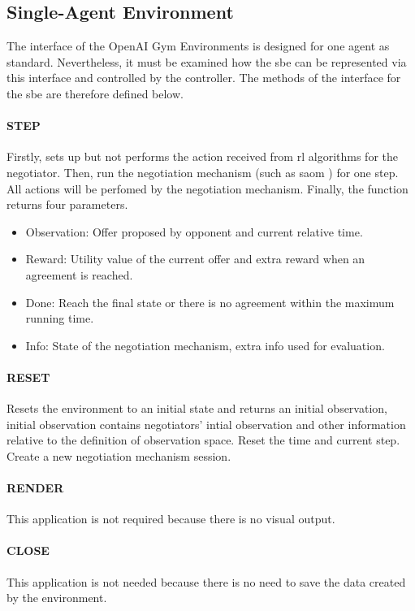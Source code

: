 \subsection{Single-Agent Environment} \label{single-agent-env}
The interface of the OpenAI Gym Environments is designed for one agent as standard. Nevertheless, it must be examined how the \gls{sbe} can be represented via this interface and controlled by the controller. The methods of the interface for the \gls{sbe} are therefore defined below. 

\paragraph{STEP} Firstly, sets up but not performs the action received from \gls{rl} algorithms for the negotiator. Then, run the negotiation mechanism (such as \gls{saom} ) for one step. All actions will be perfomed by the negotiation mechanism. Finally, the function returns four parameters.

\begin{itemize}
	\item Observation: Offer proposed by opponent and current relative time.
	\item Reward: Utility value of the current offer and extra reward when an agreement is reached.
	\item Done: Reach the final state or there is no agreement within the maximum running time.
	\item Info: State of the negotiation mechanism, extra info used for evaluation.
\end{itemize}

\paragraph{RESET} Resets the environment to an initial state and returns an initial observation, initial observation contains negotiators' intial observation and other information relative to the definition of observation space. Reset the time and current step. Create a new negotiation mechanism session.
\paragraph{RENDER} This application is not required because there is no visual output.
\paragraph{CLOSE}  This application is not needed because there is no need to save the data created by the environment.
